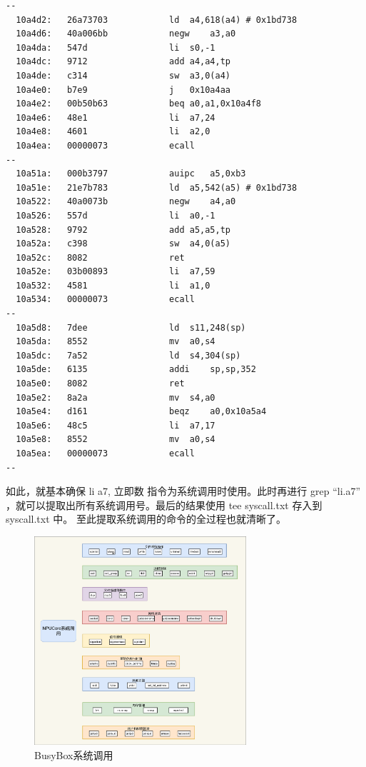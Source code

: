 \begin{lstlisting}[language={riscv}]
--
  10a4d2:	26a73703          	ld	a4,618(a4) # 0x1bd738
  10a4d6:	40a006bb          	negw	a3,a0
  10a4da:	547d                li	s0,-1
  10a4dc:	9712                add	a4,a4,tp
  10a4de:	c314                sw	a3,0(a4)
  10a4e0:	b7e9                j	0x10a4aa
  10a4e2:	00b50b63          	beq	a0,a1,0x10a4f8
  10a4e6:	48e1                li	a7,24
  10a4e8:	4601                li	a2,0
  10a4ea:	00000073          	ecall
--
  10a51a:	000b3797          	auipc	a5,0xb3
  10a51e:	21e7b783          	ld	a5,542(a5) # 0x1bd738
  10a522:	40a0073b          	negw	a4,a0
  10a526:	557d                li	a0,-1
  10a528:	9792                add	a5,a5,tp
  10a52a:	c398                sw	a4,0(a5)
  10a52c:	8082                ret
  10a52e:	03b00893          	li	a7,59
  10a532:	4581                li	a1,0
  10a534:	00000073          	ecall
--
  10a5d8:	7dee                ld	s11,248(sp)
  10a5da:	8552                mv	a0,s4
  10a5dc:	7a52                ld	s4,304(sp)
  10a5de:	6135                addi	sp,sp,352
  10a5e0:	8082                ret
  10a5e2:	8a2a                mv	s4,a0
  10a5e4:	d161                beqz	a0,0x10a5a4
  10a5e6:	48c5                li	a7,17
  10a5e8:	8552                mv	a0,s4
  10a5ea:	00000073          	ecall
--
\end{lstlisting}

如此，就基本确保 li a7, 立即数 指令为系统调用时使用。此时再进行 grep \enquote{li.a7} ，就可以提取出所有系统调用号。最后的结果使用 tee syscall.txt 存入到 syscall.txt 中。
至此提取系统调用的命令的全过程也就清晰了。

\begin{figure}[h]
    \centering
    \includegraphics[width=0.7\textwidth]{figures/09-03-NPUCore系统调用.png}
    \caption{
        BusyBox系统调用
    }
    \label{fig:BusyBox系统调用}
\end{figure}
